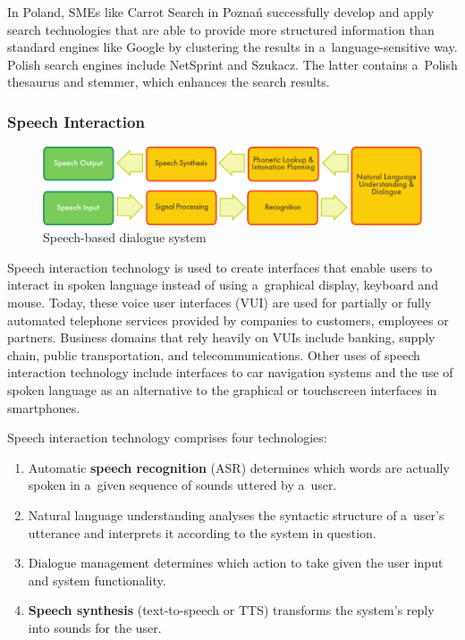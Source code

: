 \begin{multicols}{2}
In Poland, SMEs like Carrot Search in Poznań successfully develop and
apply search technologies that are able to provide more structured
information than standard engines like Google by clustering the
results in a~language-sensitive way. Polish search engines include
NetSprint and Szukacz. The latter contains a~Polish thesaurus and
stemmer, which enhances the search results. 

\subsubsection{Speech Interaction} 

\begin{figure}[t]  \center
\includegraphics[width=\textwidth]{../_media/english/simple_speech-based_dialogue_architecture}
\caption{Speech-based dialogue system} \label{fig: dialoguearch_en}
 \end{figure} 

Speech interaction technology is used to create interfaces that enable
users to interact in spoken language instead of using a~graphical
display, keyboard and mouse. Today, these voice user interfaces (VUI)
are used for partially or fully automated telephone services provided
by companies to customers, employees or partners. Business domains
that rely heavily on VUIs include banking, supply chain, public
transportation, and telecommunications. Other uses of speech
interaction technology include interfaces to car navigation systems
and the use of spoken language as an alternative to the graphical or
touchscreen interfaces in smartphones. 

Speech interaction technology comprises four technologies: 

\begin{enumerate} \item Automatic \textbf{speech recognition} (ASR)
determines which words are actually spoken in a~given sequence of
sounds uttered by a~user. \item Natural language understanding
analyses the syntactic structure of a~user’s utterance and
interprets it according to the system in question. \item Dialogue
management determines which action to take given the user input and
system functionality. \item \textbf{Speech synthesis} (text-to-speech
or TTS) transforms the system’s reply into sounds for the user.
\end{enumerate} 


\end{multicols}
